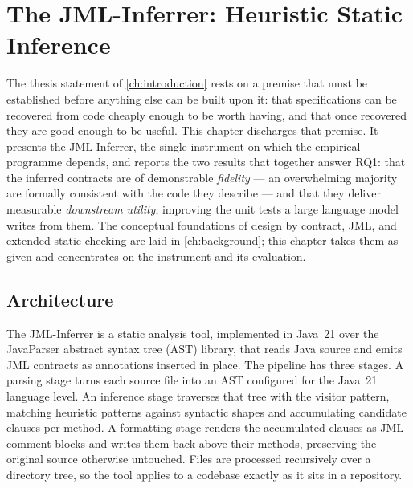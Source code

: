 \chapter{The JML-Inferrer: Heuristic Static Inference}\label{ch:inferrer}

The thesis statement of \cref{ch:introduction} rests on a premise that must be
established before anything else can be built upon it: that specifications can be
recovered from code cheaply enough to be worth having, and that once recovered
they are good enough to be useful. This chapter discharges that premise. It
presents the JML-Inferrer, the single instrument on which the empirical programme
depends, and reports the two results that together answer RQ1: that the inferred
contracts are of demonstrable \emph{fidelity} --- an overwhelming majority are
formally consistent with the code they describe --- and that they deliver
measurable \emph{downstream utility}, improving the unit tests a large language
model writes from them. The conceptual foundations of design by contract, JML, and
extended static checking are laid in \cref{ch:background}; this chapter takes them
as given and concentrates on the instrument and its evaluation.

\section{Architecture}
\label{sec:inf-architecture}

The JML-Inferrer is a static analysis tool, implemented in Java~21 over the
JavaParser abstract syntax tree (AST) library, that reads Java source and emits JML
contracts as annotations inserted in place. The pipeline has three stages. A
parsing stage turns each source file into an AST configured for the Java~21
language level. An inference stage traverses that tree with the visitor pattern,
matching heuristic patterns against syntactic shapes and accumulating candidate
clauses per method. A formatting stage renders the accumulated clauses as JML
comment blocks and writes them back above their methods, preserving the original
source otherwise untouched. Files are processed recursively over a directory tree,
so the tool applies to a codebase exactly as it sits in a repository.

